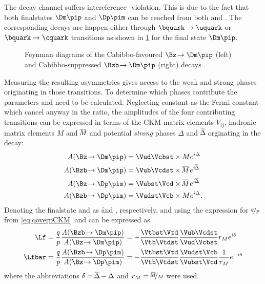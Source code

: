 The decay channel \BdToDpi suffers intereference \CP-violation. This is due to the fact that both finalstates $\Dm\pip$ and $\Dp\pim$ can be reached from both \Bz and \Bzb.
The corresponding decays are happen either through $\bquark\to\uquark$ or $\bquark\to\cquark$ transitions as shown in \cref{fig:feynmanBd2Dpi} for the final state $\Dm\pip$.
\begin{figure}[tbp]
	\centering
	
	
	\caption{Feynman diagrams of the Cabibbo-favoured $\Bz\!\to\Dm\pip$ (left) and Cabibbo-suppressed $\Bzb\!\to\Dm\pip$ (right) decays \cite{Ellis:2016jkw}.}
	\label{fig:feynmanBd2Dpi}
\end{figure}
Measuring the resulting \CP asymmetries gives access to the weak and strong phases originating in those transitions.
To determine which phases contribute the parameters \Lf and \Lfbar need to be calculated.
Neglecting constant as the Fermi constant which cancel anyway in the ratio, the amplitudes of the four contributing transitions can be expressed in terms of the CKM matrix elements $V_{ij}^{\phantom{\ast}}$, hadronic matrix elements $M$ and $\overline{\kern -1.0pt M\kern -1.0pt}$ and potential \emph{strong} phases $\Delta$ and $\overline{\kern -1.0pt \Delta\kern -1.0pt}$ orginating in the decay:
\begin{align}
A\!\left(\Bz\!\to\Dm\pip\right)&=\Vud\Vcbst\times Me^{i\Delta}\\
A\!\left(\Bzb\!\to\Dm\pip\right)&=\Vub\Vcdst\times \overline{\kern -1.0pt M\kern -1.0pt}\,e^{i\overline{\kern -1.0pt \Delta\kern -1.0pt}}\\
A\!\left(\Bz\!\to\Dp\pim\right)&=\Vubst\Vcd\times \overline{\kern -1.0pt M\kern -1.0pt}\,e^{i\overline{\kern -1.0pt \Delta\kern -1.0pt}}\\
A\!\left(\Bzb\!\to\Dp\pim\right)&=\Vudst\Vcb\times Me^{i\Delta}.
\end{align}
Denoting the finalstate \Dm\pip and \Dp\pim as \f and \fbar, respectively, and using the expression for $\nicefrac{q}{p}$ from \cref{eq:qoverpCKM} \Lf and \Lfbar can be expressed as
\begin{align}
\Lf&=\frac{q}{p}\frac{A\!\left(\Bzb\!\to\Dm\pip\right)}{A\!\left(\Bz\!\to\Dm\pip\right)}=-\frac{\Vtbst\Vtd}{\Vtb\Vtdst}\frac{\Vub\Vcdst}{\Vud\Vcbst}r_Me^{i\delta}\\
\Lfbar&=\frac{q}{p}\frac{A\!\left(\Bzb\!\to\Dp\pim\right)}{A\!\left(\Bz\!\to\Dp\pim\right)}=-\frac{\Vtbst\Vtd}{\Vtb\Vtdst}\frac{\Vudst\Vcb}{\Vubst\Vcd}\frac{1}{r_M}e^{-i\delta}
\end{align}
where the abbreviations $\delta=\overline{\kern -1.0pt \Delta\kern -1.0pt}-\Delta$ and $r_M=\nicefrac{\overline{\kern -1.0pt M\kern -1.0pt}}{M}$ were used.
